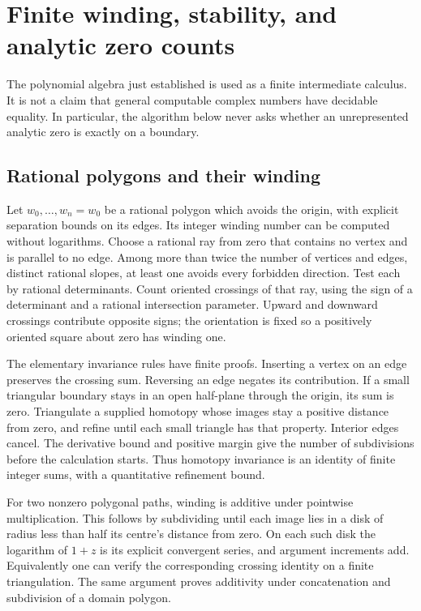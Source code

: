 

\section{Finite winding, stability, and analytic zero counts}
\label{sec:finite-winding}

The polynomial algebra just established is used as a finite intermediate
calculus. It is not a claim that general computable complex numbers have
decidable equality. In particular, the algorithm below never asks whether
an unrepresented analytic zero is exactly on a boundary.

\subsection{Rational polygons and their winding}
Let $w_0,\ldots,w_n=w_0$ be a rational polygon which avoids the origin,
with explicit separation bounds on its edges. Its integer winding number
can be computed without logarithms. Choose a rational ray from zero that
contains no vertex and is parallel to no edge. Among more than twice the
number of vertices and edges, distinct rational slopes, at least one
avoids every forbidden direction. Test each by rational determinants.
Count oriented crossings of that ray, using the sign of a determinant
and a rational intersection parameter. Upward and downward crossings
contribute opposite signs; the orientation is fixed so a positively
oriented square about zero has winding one.

The elementary invariance rules have finite proofs. Inserting a vertex
on an edge preserves the crossing sum. Reversing an edge negates its
contribution. If a small triangular boundary stays in an open half-plane
through the origin, its sum is zero. Triangulate a supplied homotopy
whose images stay a positive distance from zero, and refine until each
small triangle has that property. Interior edges cancel. The derivative
bound and positive margin give the number of subdivisions before the
calculation starts. Thus homotopy invariance is an identity of finite
integer sums, with a quantitative refinement bound.

For two nonzero polygonal paths, winding is additive under pointwise
multiplication. This follows by subdividing until each image lies in a
disk of radius less than half its centre's distance from zero. On each
such disk the logarithm of $1+z$ is its explicit convergent series, and
argument increments add. Equivalently one can verify the corresponding
crossing identity on a finite triangulation. The same argument proves
additivity under concatenation and subdivision of a domain polygon.

